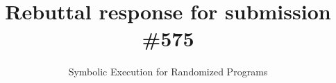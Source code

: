 \documentclass[acmsmall,review,anonymous]{acmart}\settopmatter{printfolios=true,printccs=false,printacmref=false}
\begin{document}
\title{Rebuttal response for submission \#575}         %
\subtitle{Symbolic Execution for Randomized Programs}

\maketitle







\end{document}
